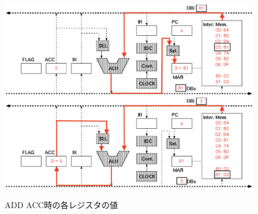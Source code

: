 \documentclass[dvipdfmx]{jsarticle}
\begin{document}
\begin{figure}[H] %
    \begin{center}
            \includegraphics[scale=0.7]{img/add3.eps}%
            \vspace{-2mm}
            \label{img:add3}
        \vspace{1cm}
            \includegraphics[scale=0.7]{img/add4.eps}%
            \vspace{-2mm}
            \label{img:add4}
    \end{center}
    \caption{ADD ACC時の各レジスタの値}
    \label{add}
\end{figure}

\clearpage
\end{document}
